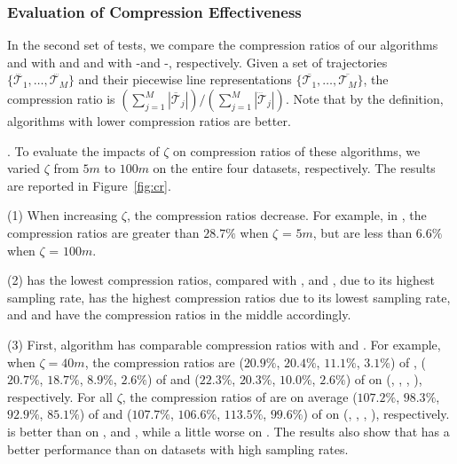 \subsubsection{Evaluation of Compression Effectiveness}

In the second set of tests, we compare the compression ratios of our algorithms \operb and \operba with \dpa and \fbqsa
and with -\operb and -\operba, respectively.
Given a set of trajectories $\{\dddot{\mathcal{T}_1}, \ldots, \dddot{\mathcal{T}_M}\}$ and their piecewise line representations
$\{\overline{\mathcal{T}_1}, \ldots, \overline{\mathcal{T}_M}\}$,
 the compression ratio is $(\sum_{j=1}^{M} |\overline{\mathcal{T}}_j |)/(\sum_{j=1}^{M} |\dddot{\mathcal{T}}_j |)$.
 Note that by the definition, algorithms with lower compression ratios are better.



.
To evaluate the impacts of $\zeta$ on compression ratios of these algorithms, we varied $\zeta$ from $5m$ to $100m$ on
 the entire four datasets, respectively.
The results are reported in Figure~\ref{fig:cr}.

\sstab (1) When increasing $\zeta$, the compression ratios decrease. For example, in \sercar,
the compression ratios are greater than $28.7\%$ when $\zeta$ = $5m$, but are less than $6.6\%$ when $\zeta$ = $100m$.

\sstab (2) \geolife has the lowest compression ratios, compared with \taxi, \truck and \sercar,
due to its highest sampling rate, \taxi has the highest compression ratios due to its lowest sampling rate, and \truck and \sercar have the compression ratios in the middle accordingly.

\sstab (3) {First, algorithm \operb has comparable compression ratios with \fbqsa and \dpa.
For example, when $\zeta = 40m$, the compression ratios are ($20.9\%$, $20.4\%$, $11.1\%$, $3.1\%$) of \fbqsa, ($20.7\%$, $18.7\%$, $8.9\%$, $2.6\%$) of \dpa and ($22.3\%$, $20.3\%$, $10.0\%$, $2.6\%$) of \operb on (\taxi, \truck, \sercar, \geolife), respectively.
For all $\zeta$, the compression ratios of \operb are on average ($107.2\%$, $98.3\%$, $92.9\%$, {$85.1\%$}) of \fbqsa and ($107.7\%$, $106.6\%$, $113.5\%$, $99.6\%$) of \dpa on (\taxi, \truck, \sercar, \geolife), respectively.
\operb is better than  \fbqsa on \truck, \sercar and \geolife, while a little worse on \taxi. The results also show that \operb has a better performance than \fbqsa on datasets with high sampling rates.}

